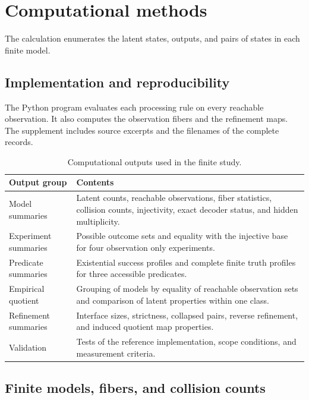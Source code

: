 \section{Computational methods}
\label{sec:computationalmethods}

The calculation enumerates the latent states, outputs, and pairs of states in each finite model.

\subsection{Implementation and reproducibility}

The Python program evaluates each processing rule on every reachable observation. It also computes the observation fibers and the refinement maps. The supplement includes source excerpts and the filenames of the complete records.

\begin{table}[tbp]
\centering
\caption{Computational outputs used in the finite study.}
\label{tab:computationaloutputs}
\small
\begin{tabularx}{\textwidth}{@{}lX@{}}
\toprule
Output group & Contents \\
\midrule
Model summaries & Latent counts, reachable observations, fiber statistics, collision counts, injectivity, exact decoder status, and hidden multiplicity. \\
Experiment summaries & Possible outcome sets and equality with the injective base for four observation only experiments. \\
Predicate summaries & Existential success profiles and complete finite truth profiles for three accessible predicates. \\
Empirical quotient & Grouping of models by equality of reachable observation sets and comparison of latent properties within one class. \\
Refinement summaries & Interface sizes, strictness, collapsed pairs, reverse refinement, and induced quotient map properties. \\
Validation & Tests of the reference implementation, scope conditions, and measurement criteria. \\
\bottomrule
\end{tabularx}
\end{table}

\subsection{Finite models, fibers, and collision counts}

